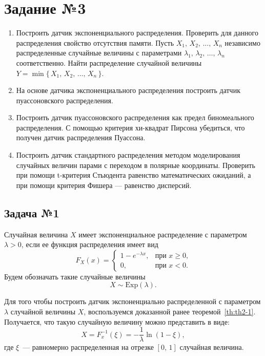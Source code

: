 \section{Задание №3}

\begin{enumerate}
        \item Построить датчик экспоненциального распределения. 
        Проверить для данного распределения свойство отсутствия памяти. Пусть $X_1,\,X_2,\,\ldots,\,X_n$ независимо распределенные случайные величины с параметрами $\lambda_1,\,\lambda_2,\,\ldots,\,\lambda_n$ соответственно. 
        Найти распределение случайной величины $Y = \min\{\,X_1,\,X_2,\,\ldots,\,X_n\,\}$.
        \item На основе датчика экспоненциального распределения построить датчик пуассоновского распределения.
        \item Построить датчик пуассоновского распределения как предел биномеального распределения.
        С помощью критерия хи-квадрат Пирсона убедиться, что получен датчик распределения Пуассона.
        \item Построить датчик стандартного распределения методом моделирования случайных величин парами с переходом в полярные координаты. Проверить при помощи t-критерия Стьюдента равенство математических ожиданий, а при помощи критерия Фишера --- равенство дисперсий.
\end{enumerate}

\subsection{Задача №1}

\begin{definition}
        Случайная величина $X$ имеет экспоненциальное распределение с параметром $\lambda > 0$, если ее функция распределения имеет вид
$$
        F_X(x) = 
        \begin{cases}
                1 - e^{-\lambda x},& \mbox{при $x \geqslant 0$,} \\
                0, & \mbox{при $x < 0$.}
        \end{cases}
$$
        Будем обозначать такие случайные величины
$$
        X \sim \mbox{Exp}(\lambda).
$$
\end{definition}

Для того чтобы построить датчик экспоненциально распределенной с параметром $\lambda$ случайной величины $X$, воспользуемся доказанной ранее теоремой~\ref{th:th2-1}. Получается, что такую случайную величину можно представить в виде:
$$
        X =
        F_x^{-1}(\xi) =
        -\frac{1}{\lambda}\ln(1 - \xi),
$$
где $\xi$~--- равномерно распределенная на отрезке $[0,\,1]$ случайная величина.

